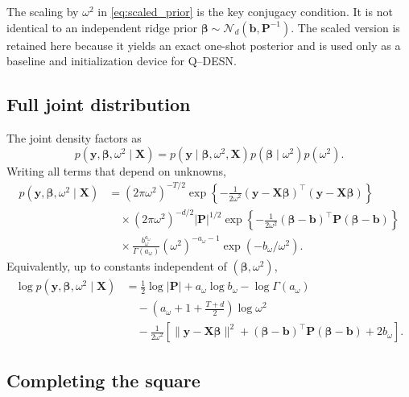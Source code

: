 \documentclass[11pt]{article}
\newcommand{\vect}[1]{\bm{#1}}
\newcommand{\mat}[1]{\bm{#1}}
\newcommand{\Normal}{\mathcal{N}}
\begin{document}
The scaling by \(\omega^2\) in \eqref{eq:scaled_prior} is the key conjugacy
condition. It is not identical to an independent ridge prior
\(\vect\beta\sim\Normal_d(\vect b,\mat P^{-1})\). The scaled version is retained
here because it yields an exact one-shot posterior and is used only as a
baseline and initialization device for Q--DESN.

\subsection{Full joint distribution}
\label{subsec:joint}

The joint density factors as
\begin{equation}
\label{eq:joint_factorization}
p(\vect y,\vect\beta,\omega^2\mid\mat X)
=p(\vect y\mid\vect\beta,\omega^2,\mat X)
 p(\vect\beta\mid\omega^2)p(\omega^2).
\end{equation}
Writing all terms that depend on unknowns,
\begin{align}
\label{eq:joint_density_explicit}
p(\vect y,\vect\beta,\omega^2\mid\mat X)
&=(2\pi\omega^2)^{-T/2}
\exp\left\{-\frac{1}{2\omega^2}
(\vect y-\mat X\vect\beta)^\top(\vect y-\mat X\vect\beta)\right\}
\nonumber\\
&\quad\times
(2\pi\omega^2)^{-d/2}|\mat P|^{1/2}
\exp\left\{-\frac{1}{2\omega^2}
(\vect\beta-\vect b)^\top\mat P(\vect\beta-\vect b)\right\}
\nonumber\\
&\quad\times
\frac{b_\omega^{a_\omega}}{\Gamma(a_\omega)}
(\omega^2)^{-a_\omega-1}\exp(-b_\omega/\omega^2).
\end{align}
Equivalently, up to constants independent of \((\vect\beta,\omega^2)\),
\begin{align}
\label{eq:log_joint}
\log p(\vect y,\vect\beta,\omega^2\mid\mat X)
&=\frac12\log|\mat P|+a_\omega\log b_\omega-\log\Gamma(a_\omega)
\nonumber\\
&\quad
-\left(a_\omega+1+\frac{T+d}{2}\right)\log\omega^2
\nonumber\\
&\quad
-\frac{1}{2\omega^2}\left[
\|\vect y-\mat X\vect\beta\|^2
+(\vect\beta-\vect b)^\top\mat P(\vect\beta-\vect b)
+2b_\omega\right].
\end{align}

\subsection{Completing the square}
\label{subsec:complete_square}
\end{document}
